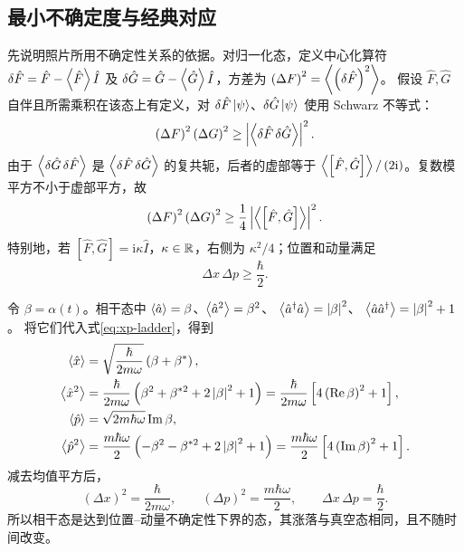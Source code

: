 \subsection{最小不确定度与经典对应}
先说明照片所用不确定性关系的依据。对归一化态，定义中心化算符
$\delta\hat F=\hat F-\Braket{\hat F}\hat I$ 及
$\delta\hat G=\hat G-\Braket{\hat G}\hat I$，方差为
$\left(\Delta F\right)^2=\Braket{\left(\delta\hat F\right)^2}$。
假设 $\hat F,\hat G$ 自伴且所需乘积在该态上有定义，对
$\delta\hat F\Ket{\psi}$、$\delta\hat G\Ket{\psi}$ 使用 Schwarz 不等式：
\begin{equation}
\left(\Delta F\right)^2\left(\Delta G\right)^2
\geq\left|\Braket{\delta\hat F\,\delta\hat G}\right|^2.
\end{equation}
由于 $\Braket{\delta\hat G\,\delta\hat F}$
是 $\Braket{\delta\hat F\,\delta\hat G}$ 的复共轭，后者的虚部等于
$\Braket{\left[\hat F,\hat G\right]}/\left(2\mathrm{i}\right)$。复数模平方不小于虚部平方，故
\begin{equation}
\left(\Delta F\right)^2\left(\Delta G\right)^2\geq
\frac14\left|\Braket{\left[\hat F,\hat G\right]}\right|^2.
\end{equation}
特别地，若 $\left[\hat F,\hat G\right]=\mathrm{i}\kappa\hat I$，$\kappa\in\mathbb{R}$，右侧为 $\kappa^2/4$；位置和动量满足
\begin{equation}
\Delta x\,\Delta p\geq\frac{\hbar}{2}.
\end{equation}

令 $\beta=\alpha\left(t\right)$。相干态中
$\Braket{\hat a}=\beta$、$\Braket{\hat a^2}=\beta^2$、
$\Braket{\hat a^\dagger\hat a}=\left|\beta\right|^2$、
$\Braket{\hat a\hat a^\dagger}=\left|\beta\right|^2+1$。
将它们代入式\eqref{eq:xp-ladder}，得到
\begin{align}
\Braket{\hat x}&=\sqrt{\frac{\hbar}{2m\omega}}\left(\beta+\beta^*\right),\\
\Braket{\hat x^2}&=\frac{\hbar}{2m\omega}
\left(\beta^2+\beta^{*2}+2\left|\beta\right|^2+1\right)
=\frac{\hbar}{2m\omega}\left[4\left(\operatorname{Re}\beta\right)^2+1\right],\\
\Braket{\hat p}&=\sqrt{2m\hbar\omega}\operatorname{Im}\beta,\\
\Braket{\hat p^2}&=\frac{m\hbar\omega}{2}
\left(-\beta^2-\beta^{*2}+2\left|\beta\right|^2+1\right)
=\frac{m\hbar\omega}{2}\left[4\left(\operatorname{Im}\beta\right)^2+1\right].
\end{align}
减去均值平方后，
\begin{equation}
\boxed{\left(\Delta x\right)^2=\frac{\hbar}{2m\omega},\qquad
\left(\Delta p\right)^2=\frac{m\hbar\omega}{2},\qquad
\Delta x\,\Delta p=\frac{\hbar}{2}.}
\end{equation}
所以相干态是达到位置--动量不确定性下界的态，其涨落与真空态相同，且不随时间改变。

